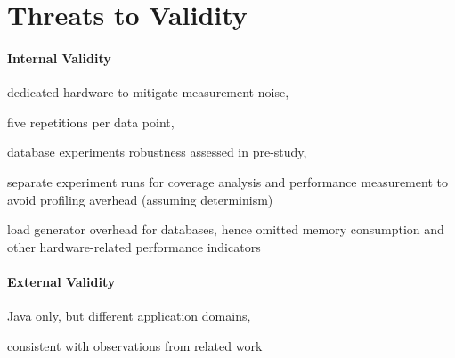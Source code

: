 \section{Threats to Validity}\label{sec:threats}
\paragraph{Internal Validity}\label{sec:internal_validity}

\begin{compactitem}
	\item dedicated hardware to mitigate measurement noise, 
	\item five repetitions per data point, 
	\item database experiments robustness assessed in pre-study,
	\item separate experiment runs for coverage analysis and performance measurement to avoid profiling averhead (assuming determinism)
	\item load generator overhead for databases, hence omitted memory consumption and other hardware-related performance indicators 
\end{compactitem}

\paragraph{External Validity}\label{sec:external_validity}
\begin{compactitem}
	\item Java only, but different application domains,
	\item consistent with observations from related work
\end{compactitem}

